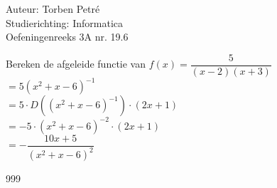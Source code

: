 \documentclass[a4paper]{article}
\begin{document}
  
\noindent \large Auteur: Torben Petré \\
\noindent \large Studierichting: Informatica\\
\noindent \large Oefeningenreeks 3A nr. 19.6\\

\medskip

\normalsize

Bereken de afgeleide functie van $f(x) = \dfrac{5}{(x-2)(x+3)}$\\

$= 5(x^2 + x - 6)^{-1}$\\

$= 5 \cdot D((x^2 + x - 6)^{-1}) \cdot (2x + 1)$\\

$= -5 \cdot (x^2 + x - 6)^{-2} \cdot (2x + 1)$\\

$= - \dfrac{10x + 5}{(x^2 + x - 6)^2}$\\

\begin{thebibliography}{999}
\end{thebibliography}
\end{document}
